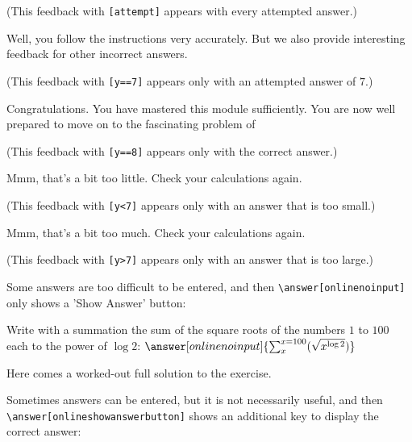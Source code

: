 \documentclass{ximera}
\begin{document}
\begin{exercise}
\begin{question}
\begin{feedback}[attempt]
            (This feedback with \verb|[attempt]| appears with every attempted answer.)   
           \end{feedback}

          \begin{feedback}[y==7]
            Well, you follow the instructions very accurately. But we also provide interesting feedback for other incorrect answers.

            (This feedback with \verb|[y==7]| appears only with an attempted answer of $7$.)   

          \end{feedback}
          \begin{feedback}[y==8]
          Congratulations. You have mastered this module sufficiently. You are now well prepared to move on to the fascinating problem of 

          (This feedback with \verb|[y==8]| appears only with the correct answer.)   

          \end{feedback}
          \begin{feedback}[y<7]
              Mmm, that's a bit too little. Check your calculations again.

              (This feedback with \verb|[y<7]| appears only with an answer that is too small.)   
            \end{feedback}
          \begin{feedback}[y>8]
              Mmm, that's a bit too much. Check your calculations again.

              (This feedback with \verb|[y>7]| appears only with an answer that is too large.)   

           \end{feedback}
       \end{question}

	\begin{question}
		Some answers are too difficult to be entered, and then \verb|\answer[onlinenoinput]| only shows a 'Show Answer' button:

		Write with a summation the sum of the square roots of the numbers $1$ to $100$ each to the power of $\log 2$: $\answer[onlinenoinput]{\sum_x^{x=100}(\sqrt{x^{\log 2}})}$

		\begin{oplossing}
			Here comes a worked-out full solution to the exercise.
		\end{oplossing}
	\end{question}
	\begin{question}\label{itm:showCase:laatste_oefening}
		Sometimes answers can be entered, but it is not necessarily useful, and then \verb|\answer[onlineshowanswerbutton]| shows an additional key to display the correct answer:


\end{question}
\end{exercise}
\end{document}
